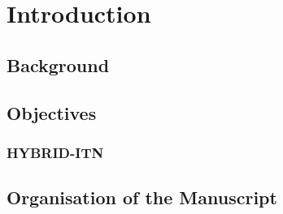 \chapter{Introduction}

\section*{Background}


\section*{Objectives}


\subsection*{HYBRID-ITN}


\section*{Organisation of the Manuscript}

